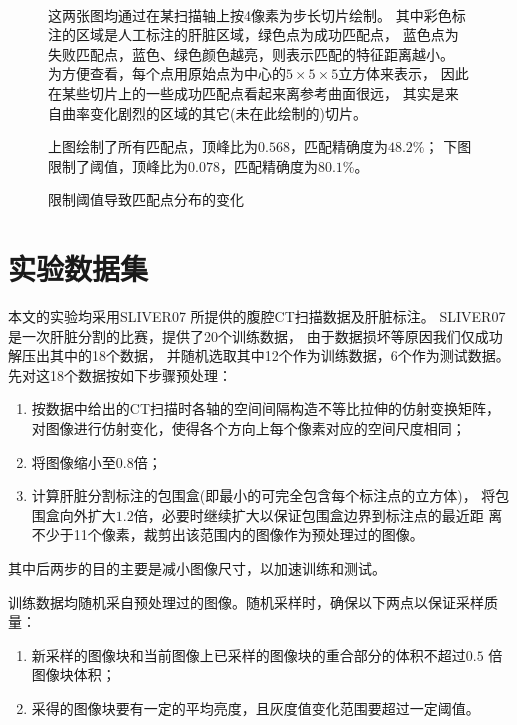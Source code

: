 \begin{figure}[h!]
    {
         \\
        \vspace{0.2em}
        \caption{限制阈值导致匹配点分布的变化}
        \label{fig:expr:match}
    }
    \footnotesize
    这两张图均通过在某扫描轴上按4像素为步长切片绘制。
    其中彩色标注的区域是人工标注的肝脏区域，绿色点为成功匹配点，
    蓝色点为失败匹配点，蓝色、绿色颜色越亮，则表示匹配的特征距离越小。
    为方便查看，每个点用原始点为中心的$5\times 5 \times 5$立方体来表示，
    因此在某些切片上的一些成功匹配点看起来离参考曲面很远，
    其实是来自曲率变化剧烈的区域的其它(未在此绘制的)切片。

    上图绘制了所有匹配点，顶峰比为$0.568$，匹配精确度为$48.2\%$；
    下图限制了阈值，顶峰比为$0.078$，匹配精确度为$80.1\%$。
\end{figure}


\section{实验数据集}
本文的实验均采用SLIVER07\cite{heimann2009comparison}
所提供的腹腔CT扫描数据及肝脏标注。
SLIVER07是一次肝脏分割的比赛，提供了20个训练数据，
由于数据损坏等原因我们仅成功解压出其中的18个数据，
并随机选取其中12个作为训练数据，6个作为测试数据。
先对这18个数据按如下步骤预处理：
\begin{enumerate}
    \item 按数据中给出的CT扫描时各轴的空间间隔构造不等比拉伸的仿射变换矩阵，
        对图像进行仿射变化，使得各个方向上每个像素对应的空间尺度相同；
    \item 将图像缩小至$0.8$倍；
    \item 计算肝脏分割标注的包围盒(即最小的可完全包含每个标注点的立方体)，
        将包围盒向外扩大$1.2$倍，必要时继续扩大以保证包围盒边界到标注点的最近距
        离不少于11个像素，裁剪出该范围内的图像作为预处理过的图像。
\end{enumerate}
其中后两步的目的主要是减小图像尺寸，以加速训练和测试。

训练数据均随机采自预处理过的图像。随机采样时，确保以下两点以保证采样质量：
\begin{enumerate}
    \item 新采样的图像块和当前图像上已采样的图像块的重合部分的体积不超过$0.5$
        倍图像块体积；
    \item 采得的图像块要有一定的平均亮度，且灰度值变化范围要超过一定阈值。
\end{enumerate}

